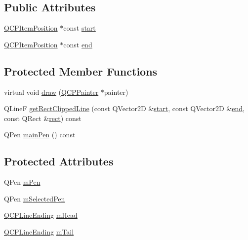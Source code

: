 \subsection*{Public Attributes}
\begin{DoxyCompactItemize}
\item 
\hyperlink{class_q_c_p_item_position}{Q\+C\+P\+Item\+Position} $\ast$const \hyperlink{class_q_c_p_item_line_a602da607a09498b0f152ada1d6851bc5}{start}
\item 
\hyperlink{class_q_c_p_item_position}{Q\+C\+P\+Item\+Position} $\ast$const \hyperlink{class_q_c_p_item_line_a15598864c1c22a2497a1979c4980c4e1}{end}
\end{DoxyCompactItemize}
\subsection*{Protected Member Functions}
\begin{DoxyCompactItemize}
\item 
virtual void \hyperlink{class_q_c_p_item_line_a1fc045dd33919f8006df0692aeb0e84a}{draw} (\hyperlink{class_q_c_p_painter}{Q\+C\+P\+Painter} $\ast$painter)
\item 
Q\+Line\+F \hyperlink{class_q_c_p_item_line_a36e8620019a221ccea4357f0287b81c2}{get\+Rect\+Clipped\+Line} (const Q\+Vector2\+D \&\hyperlink{class_q_c_p_item_line_a602da607a09498b0f152ada1d6851bc5}{start}, const Q\+Vector2\+D \&\hyperlink{class_q_c_p_item_line_a15598864c1c22a2497a1979c4980c4e1}{end}, const Q\+Rect \&\hyperlink{_gen_blob_8m_aea8f6815d9a63491fc422c5572c6b3c3}{rect}) const 
\item 
Q\+Pen \hyperlink{class_q_c_p_item_line_a7b5bc4ebacb55774b87c91b308ca7912}{main\+Pen} () const 
\end{DoxyCompactItemize}
\subsection*{Protected Attributes}
\begin{DoxyCompactItemize}
\item 
Q\+Pen \hyperlink{class_q_c_p_item_line_abbb544d5bb927dfe4e81a7f3ca4c65ac}{m\+Pen}
\item 
Q\+Pen \hyperlink{class_q_c_p_item_line_aff858ad6dde3b90024814ca4b116f278}{m\+Selected\+Pen}
\item 
\hyperlink{class_q_c_p_line_ending}{Q\+C\+P\+Line\+Ending} \hyperlink{class_q_c_p_item_line_a51603f28ab7ddb1c1a95ea384791d3ed}{m\+Head}
\item 
\hyperlink{class_q_c_p_line_ending}{Q\+C\+P\+Line\+Ending} \hyperlink{class_q_c_p_item_line_ab8ed61dfe15bbb1cbf9b95eae95e242f}{m\+Tail}
\end{DoxyCompactItemize}
